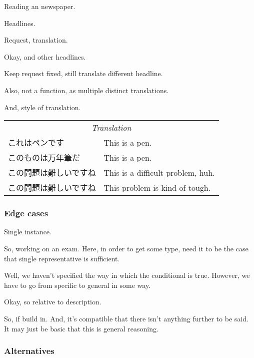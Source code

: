 \begin{note}
  \begin{illustration}[Translation]
    Reading an newspaper.

    Headlines.

    Request, translation.

    Okay, and other headlines.
  \end{illustration}

  Keep request fixed, still translate different headline.

  Also, not a function, as multiple distinct translations.

  And, style of translation.

  \begin{center}
    \begin{tabular}[h]{p{.55\linewidth}|p{.4\linewidth}}
      \multicolumn{2}{c}{\emph{Translation}} \\
      これはペンです & This is a pen. \\
      このものは万年筆だ & This is a pen. \\
      この問題は難しいですね & This is a difficult problem, huh. \\
      この問題は難しいですね & This problem is kind of tough. \\
    \end{tabular}
  \end{center}
\end{note}


\subsubsection{Edge cases}
\label{sec:not-tr0}

\begin{note}
  Single instance.

  So, working on an exam.
  Here, in order to get some type, need it to be the case that single representative is sufficient.

  Well, we haven't specified the way in which the conditional is true.
  However, we have to go from specific to general in some way.

  Okay, so relative to description.

  So, if build in.
  And, it's compatible that there isn't anything further to be said.
  It may just be basic that this is general reasoning.
\end{note}


\subsubsection{Alternatives}
\label{sec:alternatives}

